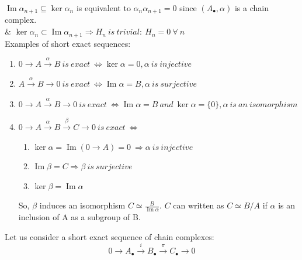 \documentclass[11pt,a4paper]{report}
\DeclareMathOperator{\Ima}{Im}
\begin{document}
                 $ \Ima\alpha_{n+1} \subseteq \ker\alpha_n$ is equivalent to $\alpha_n\alpha_{n+1} = 0$ since $(A_\bullet, \alpha)$ is a chain complex.\\
                 \& $ \ker\alpha_n \subset \Ima\alpha_{n+1} \Rightarrow H_{n} \ is\ trivial: \ H_{n} = 0 \ \forall \ n $ \\

                Examples of short exact sequences:

                \begin{enumerate}
                \item $ 0 \rightarrow A \xrightarrow{\alpha} B \ is\ exact\ \iff \ker\alpha = 0, \alpha \ is\ injective $
                \item $ A \xrightarrow{\alpha} B \rightarrow 0 \ is\ exact\ \iff \Ima\alpha = B, \alpha \ is\ surjective $
                \item
                  $
                    0 \rightarrow A \xrightarrow{\alpha} B \rightarrow 0 \ is\ exact\ \iff \Ima\alpha = B \ and \ \ker\alpha = \{0\}, \alpha \ is \ an \ isomorphism$
                \item
                  $ 0 \rightarrow A \xrightarrow{\alpha} B \xrightarrow{\beta} C \rightarrow 0 \ is\ exact\ \iff $
                   \begin{enumerate}
                    \item
                     $\ker \alpha = \Ima(0 \rightarrow A) = 0\ \Rightarrow \alpha\ is\ injective$
                    \item
                    $\Ima\beta = C \Rightarrow \beta \ is\ surjective$
                    \item
                    $\ker \beta = \Ima\alpha $

                   \end{enumerate}

                    So, $\beta$  induces an isomorphism $C \simeq \frac{B}{\Ima\alpha}$.
                    $C$ can written as $C \simeq B/A$ if $\alpha$ is an inclusion of A as a subgroup of B.
                \end{enumerate}


                Let us consider a short exact sequence of chain complexes: \\
                \[
                0 \rightarrow A_\bullet \xrightarrow{i} B_\bullet \xrightarrow{\pi} C_\bullet \rightarrow 0
                \]
\end{document}
